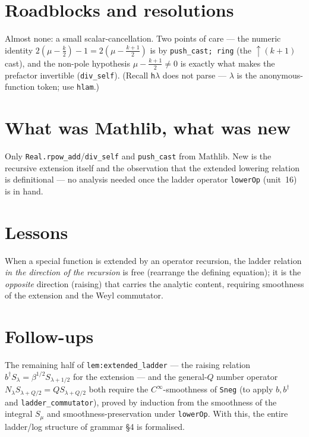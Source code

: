 \documentclass[11pt]{article}
\begin{document}
\section{Roadblocks and resolutions}
Almost none: a small scalar-cancellation. Two points of care --- the numeric identity
$2(\mu-\tfrac k2)-1=2(\mu-\tfrac{k+1}2)$ is by \texttt{push\_cast; ring} (the $\uparrow(k+1)$ cast), and
the non-pole hypothesis $\mu-\tfrac{k+1}2\ne0$ is exactly what makes the prefactor invertible
(\texttt{div\_self}). (Recall \texttt{h$\lambda$} does not parse --- \texttt{$\lambda$} is the
anonymous-function token; use \texttt{hlam}.)

\section{What was Mathlib, what was new}
Only \texttt{Real.rpow\_add}/\texttt{div\_self} and \texttt{push\_cast} from Mathlib. New is the recursive
extension itself and the observation that the extended lowering relation is definitional --- no analysis
needed once the ladder operator \texttt{lowerOp} (unit~16) is in hand.

\section{Lessons}
When a special function is extended by an operator recursion, the ladder relation \emph{in the direction
of the recursion} is free (rearrange the defining equation); it is the \emph{opposite} direction (raising)
that carries the analytic content, requiring smoothness of the extension and the Weyl commutator.

\section{Follow-ups}
The remaining half of \texttt{lem:extended\_ladder} --- the raising relation
$b^\dagger S_\lambda=\beta^{1/2}S_{\lambda+1/2}$ for the extension --- and the general-$Q$ number operator
$N_\lambda S_{\lambda+Q/2}=QS_{\lambda+Q/2}$ both require the $C^\infty$-smoothness of \texttt{Sneg} (to
apply $b,b^\dagger$ and \texttt{ladder\_commutator}), proved by induction from the smoothness of the
integral $S_\mu$ and smoothness-preservation under \texttt{lowerOp}. With this, the entire ladder/log
structure of grammar \S4 is formalised.
\end{document}
